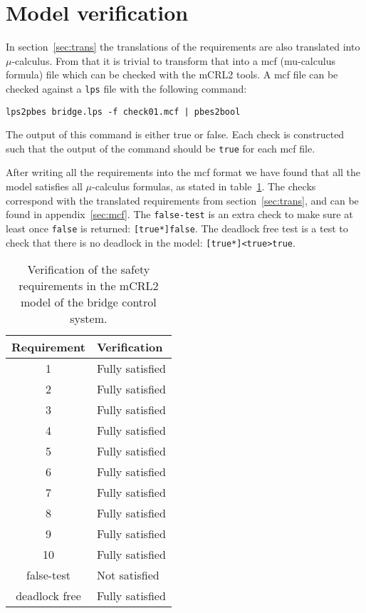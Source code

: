 \section{Model verification}
\label{sec:check}

In section~\ref{sec:trans} the translations of the requirements are also
translated into $\mu$-calculus. From that it is trivial to transform that into
a mcf (mu-calculus formula) file which can be checked with the mCRL2 tools. A
mcf file can be checked against a \texttt{lps} file with the following command:

\begin{verbatim}
lps2pbes bridge.lps -f check01.mcf | pbes2bool
\end{verbatim}

The output of this command is either true or false. Each check is constructed such
that the output of the command should be \texttt{true} for each mcf file.

After writing all the requirements into the mcf format we have found that all
the model satisfies all $\mu$-calculus formulas, as stated in
table~\ref{tab:checks}. The checks correspond with the translated requirements
from section~\ref{sec:trans}, and can be found in appendix~\ref{sec:mcf}. The
\texttt{false-test} is an extra check to make sure at least once \texttt{false}
is returned: \texttt{[true*]false}. The deadlock free test is a test to check
that there is no deadlock in the model: \texttt{[true*]<true>true}.

\begin{table}[htb]%
\centering
\begin{tabular}{|c|l|}
	\hline
	\textbf{Requirement} & \textbf{Verification}\\
	\hline
	1 & Fully satisfied\\
	2 & Fully satisfied\\
	3 & Fully satisfied\\
	4 & Fully satisfied\\
	5 & Fully satisfied\\
	6 & Fully satisfied\\
	7 & Fully satisfied\\
	8 & Fully satisfied\\
	9 & Fully satisfied\\
	10 & Fully satisfied\\
	\hline
	false-test & Not satisfied\\
	deadlock free & Fully satisfied\\
	\hline
\end{tabular}
\caption{Verification of the safety requirements in the mCRL2 model of the bridge control system.}
\label{tab:checks}
\end{table}

\newpage
